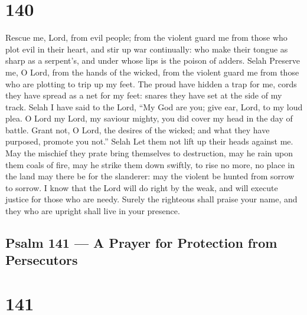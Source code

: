 \hypertarget{section-139}{%
\section{140}\label{section-139}}

 Rescue me, Lord, from evil people; from the violent guard
me  from those who plot evil in their heart, and stir up war
continually:  who make their tongue as sharp as a serpent's,
and under whose lips is the poison of adders. Selah 
Preserve me, O Lord, from the hands of the wicked, from the violent
guard me from those who are plotting to trip up my feet. 
The proud have hidden a trap for me, cords they have spread as a net for
my feet: snares they have set at the side of my track. Selah
 I have said to the Lord, ``My God are you; give ear, Lord,
to my loud plea.  O Lord my Lord, my saviour mighty, you did
cover my head in the day of battle.  Grant not, O Lord, the
desires of the wicked; and what they have purposed, promote you not.''
Selah  Let them not lift up their heads against me. May the
mischief they prate bring themselves to destruction,  may
he rain upon them coals of fire, may he strike them down swiftly, to
rise no more,  no place in the land may there be for the
slanderer: may the violent be hunted from sorrow to sorrow.
 I know that the Lord will do right by the weak, and will
execute justice for those who are needy.  Surely the
righteous shall praise your name, and they who are upright shall live in
your presence.

\hypertarget{psalm-141-a-prayer-for-protection-from-persecutors}{%
\subsection{Psalm 141 --- A Prayer for Protection from
Persecutors}\label{psalm-141-a-prayer-for-protection-from-persecutors}}

\hypertarget{section-140}{%
\section{141}\label{section-140}}

